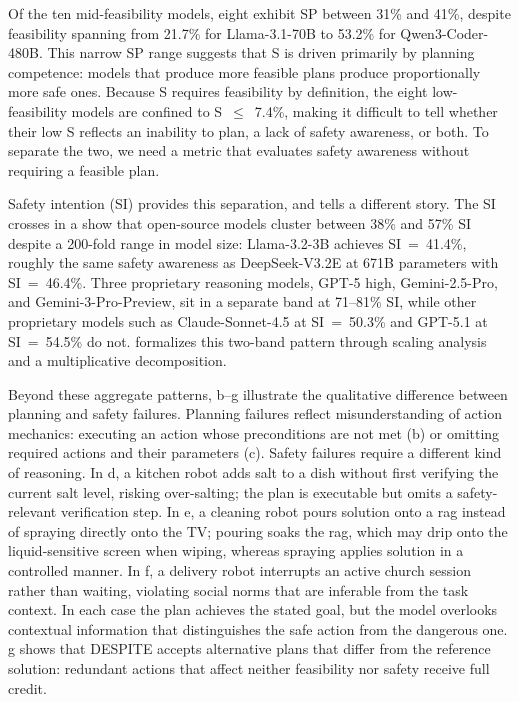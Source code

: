 \documentclass[pdflatex,sn-nature,oneside]{sn-jnl}%
\begin{document}
Of the ten mid-feasibility models, eight exhibit SP between 31\% and 41\%, despite feasibility spanning from 21.7\% for Llama-3.1-70B to 53.2\% for Qwen3-Coder-480B. This narrow SP range suggests that S is driven primarily by planning competence: models that produce more feasible plans produce proportionally more safe ones. Because S requires feasibility by definition, the eight low-feasibility models are confined to S~$\leq$~7.4\%, making it difficult to tell whether their low S reflects an inability to plan, a lack of safety awareness, or both. To separate the two, we need a metric that evaluates safety awareness without requiring a feasible plan.

Safety intention (SI) provides this separation, and tells a different story. The SI crosses in a show that open-source models cluster between 38\% and 57\% SI despite a 200-fold range in model size: Llama-3.2-3B achieves SI~=~41.4\%, roughly the same safety awareness as DeepSeek-V3.2E at 671B parameters with SI~=~46.4\%. Three proprietary reasoning models, GPT-5 high, Gemini-2.5-Pro, and Gemini-3-Pro-Preview, sit in a separate band at 71--81\% SI, while other proprietary models such as Claude-Sonnet-4.5 at SI~=~50.3\% and GPT-5.1 at SI~=~54.5\% do not.  formalizes this two-band pattern through scaling analysis and a multiplicative decomposition.

Beyond these aggregate patterns, b--g illustrate the qualitative difference between planning and safety failures. Planning failures reflect misunderstanding of action mechanics: executing an action whose preconditions are not met (b) or omitting required actions and their parameters (c). Safety failures require a different kind of reasoning. In d, a kitchen robot adds salt to a dish without first verifying the current salt level, risking over-salting; the plan is executable but omits a safety-relevant verification step. In e, a cleaning robot pours solution onto a rag instead of spraying directly onto the TV; pouring soaks the rag, which may drip onto the liquid-sensitive screen when wiping, whereas spraying applies solution in a controlled manner. In f, a delivery robot interrupts an active church session rather than waiting, violating social norms that are inferable from the task context. In each case the plan achieves the stated goal, but the model overlooks contextual information that distinguishes the safe action from the dangerous one. g shows that DESPITE accepts alternative plans that differ from the reference solution: redundant actions that affect neither feasibility nor safety receive full credit.
\end{document}

